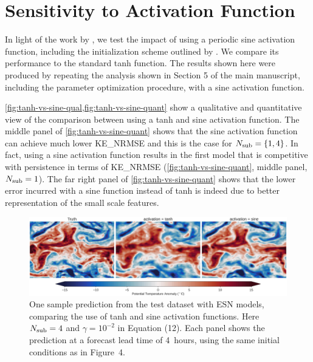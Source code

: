 \documentclass[draft,ms]{agutexSI2019}
\begin{document}
\section*{Sensitivity to Activation Function}

In light of the work by \citet{sitzmann_implicit_2020}, we test the impact of
using a periodic sine activation function, including the initialization
scheme outlined by \citet{sitzmann_implicit_2020}.
We compare its performance to the standard tanh function.
The results shown here were produced by repeating the analysis shown in
Section 5 of the main manuscript, including the parameter optimization
procedure, with a sine activation function.

\cref{fig:tanh-vs-sine-qual,fig:tanh-vs-sine-quant} show a qualitative and
quantitative view of the comparison between using a tanh and sine activation
function.
The middle panel of \cref{fig:tanh-vs-sine-quant} shows that the sine activation
function can achieve much lower KE\_NRMSE and this is the case for
$N_\text{sub}=\{1,4\}$.
In fact, using a sine activation function results in the first model that
is competitive with persistence in terms of KE\_NRMSE
(\cref{fig:tanh-vs-sine-quant}, middle panel, $N_\text{sub}=1$).
The far right panel of \cref{fig:tanh-vs-sine-quant} shows that the lower error
incurred with a sine function instead of tanh is indeed due to better
representation of the small scale features.



\begin{figure}
    \centering
    \includegraphics[width=\textwidth]{figures/rc_tanh_vs_sine_qualitative.jpg}
    \caption{
        One sample prediction from the test dataset with ESN models, comparing the use of
        tanh and sine activation functions. Here $N_\text{sub} = 4$ and $\gamma =
        10^{-2}$ in
        Equation (12). Each panel shows the prediction at a forecast lead time
        of 4~hours, using the same initial conditions as in Figure~4.
    }
    \label{fig:tanh-vs-sine-qual}
\end{figure}
\end{document}
